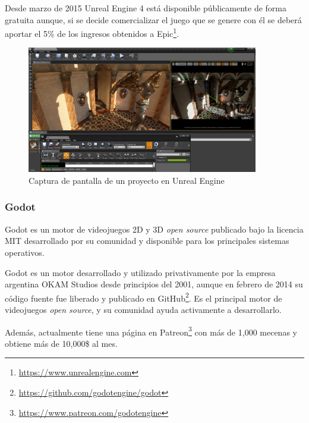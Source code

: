 Desde marzo de 2015 Unreal Engine 4 está disponible públicamente de forma gratuita aunque, si se decide comercializar el juego que se genere con él se deberá aportar el 5\% de los ingresos obtenidos a Epic\footnote{\url{https://www.unrealengine.com}}.

\begin{figure}[!h]
\begin{center}
\includegraphics[width=0.9\textwidth]{imagenes/2/unreal-engine-4.jpg}
\caption{Captura de pantalla de un proyecto en Unreal Engine}
\label{fig:unreal}
\end{center}
\end{figure}

\subsubsection{Godot}

Godot es un motor de videojuegos 2D y 3D \textit{open source} publicado bajo la licencia \acs{MIT} desarrollado por su comunidad y disponible para los principales sistemas operativos.

Godot es un motor desarrollado y utilizado privativamente por la empresa argentina OKAM Studios desde principios del 2001, aunque en febrero de 2014 su código fuente fue liberado y publicado en GitHub\footnote{\url{https://github.com/godotengine/godot}}. Es el principal motor de videojuegos \textit{open source}, y su comunidad ayuda activamente a desarrollarlo. 

Además, actualmente tiene una página en Patreon\footnote{\url{https://www.patreon.com/godotengine}} con más de 1,000 mecenas y obtiene más de 10,000\$ al mes.

